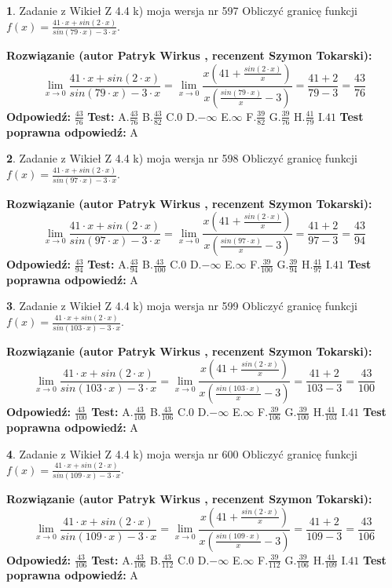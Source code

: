 \documentclass[12pt, a4paper]{article}
\theoremstyle{definition} %
\newtheorem{zad}{}
\newcommand{\zadStart}[1]{\begin{zad}#1\newline}
\newcommand{\zadStop}{\end{zad}}
\newcommand{\rozwStart}[2]{\noindent \textbf{Rozwiązanie (autor #1 , recenzent #2): }\newline}
\newcommand{\rozwStop}{\newline}
\newcommand{\odpStart}{\noindent \textbf{Odpowiedź:}\newline}
\newcommand{\odpStop}{\newline}
\newcommand{\testStart}{\noindent \textbf{Test:}\newline}
\newcommand{\testStop}{\newline}
\newcommand{\kluczStart}{\noindent \textbf{Test poprawna odpowiedź:}\newline}
\newcommand{\kluczStop}{\newline}
\begin{document}
\zadStart{Zadanie z Wikieł Z 4.4 k) moja wersja nr 597}
Obliczyć granicę funkcji $f(x)=\frac{41\cdot x +sin(2\cdot x)}{sin(79\cdot x) -3\cdot x}$.
\zadStop
\rozwStart{Patryk Wirkus}{Szymon Tokarski}
$$\lim\limits_{x\to 0}\frac{41\cdot x +sin(2\cdot x)}{sin(79\cdot x) -3\cdot x}
=\lim\limits_{x\to 0}\frac{x(41+\frac{sin(2\cdot x)}{x})}{x(\frac{sin(79\cdot x)}{x}-3)}
=\frac{41+2}{79-3} = \frac{43}{76}$$
\rozwStop
\odpStart
$\frac{43}{76}$
\odpStop
\testStart
A.$\frac{43}{76}$
B.$\frac{43}{82}$
C.$0$
D.$-\infty$
E.$\infty$
F.$\frac{39}{82}$
G.$\frac{39}{76}$
H.$\frac{41}{79}$
I.$41$
\testStop
\kluczStart
A
\kluczStop



\zadStart{Zadanie z Wikieł Z 4.4 k) moja wersja nr 598}
Obliczyć granicę funkcji $f(x)=\frac{41\cdot x +sin(2\cdot x)}{sin(97\cdot x) -3\cdot x}$.
\zadStop
\rozwStart{Patryk Wirkus}{Szymon Tokarski}
$$\lim\limits_{x\to 0}\frac{41\cdot x +sin(2\cdot x)}{sin(97\cdot x) -3\cdot x}
=\lim\limits_{x\to 0}\frac{x(41+\frac{sin(2\cdot x)}{x})}{x(\frac{sin(97\cdot x)}{x}-3)}
=\frac{41+2}{97-3} = \frac{43}{94}$$
\rozwStop
\odpStart
$\frac{43}{94}$
\odpStop
\testStart
A.$\frac{43}{94}$
B.$\frac{43}{100}$
C.$0$
D.$-\infty$
E.$\infty$
F.$\frac{39}{100}$
G.$\frac{39}{94}$
H.$\frac{41}{97}$
I.$41$
\testStop
\kluczStart
A
\kluczStop



\zadStart{Zadanie z Wikieł Z 4.4 k) moja wersja nr 599}
Obliczyć granicę funkcji $f(x)=\frac{41\cdot x +sin(2\cdot x)}{sin(103\cdot x) -3\cdot x}$.
\zadStop
\rozwStart{Patryk Wirkus}{Szymon Tokarski}
$$\lim\limits_{x\to 0}\frac{41\cdot x +sin(2\cdot x)}{sin(103\cdot x) -3\cdot x}
=\lim\limits_{x\to 0}\frac{x(41+\frac{sin(2\cdot x)}{x})}{x(\frac{sin(103\cdot x)}{x}-3)}
=\frac{41+2}{103-3} = \frac{43}{100}$$
\rozwStop
\odpStart
$\frac{43}{100}$
\odpStop
\testStart
A.$\frac{43}{100}$
B.$\frac{43}{106}$
C.$0$
D.$-\infty$
E.$\infty$
F.$\frac{39}{106}$
G.$\frac{39}{100}$
H.$\frac{41}{103}$
I.$41$
\testStop
\kluczStart
A
\kluczStop



\zadStart{Zadanie z Wikieł Z 4.4 k) moja wersja nr 600}
Obliczyć granicę funkcji $f(x)=\frac{41\cdot x +sin(2\cdot x)}{sin(109\cdot x) -3\cdot x}$.
\zadStop
\rozwStart{Patryk Wirkus}{Szymon Tokarski}
$$\lim\limits_{x\to 0}\frac{41\cdot x +sin(2\cdot x)}{sin(109\cdot x) -3\cdot x}
=\lim\limits_{x\to 0}\frac{x(41+\frac{sin(2\cdot x)}{x})}{x(\frac{sin(109\cdot x)}{x}-3)}
=\frac{41+2}{109-3} = \frac{43}{106}$$
\rozwStop
\odpStart
$\frac{43}{106}$
\odpStop
\testStart
A.$\frac{43}{106}$
B.$\frac{43}{112}$
C.$0$
D.$-\infty$
E.$\infty$
F.$\frac{39}{112}$
G.$\frac{39}{106}$
H.$\frac{41}{109}$
I.$41$
\testStop
\kluczStart
A
\kluczStop
\end{document}
